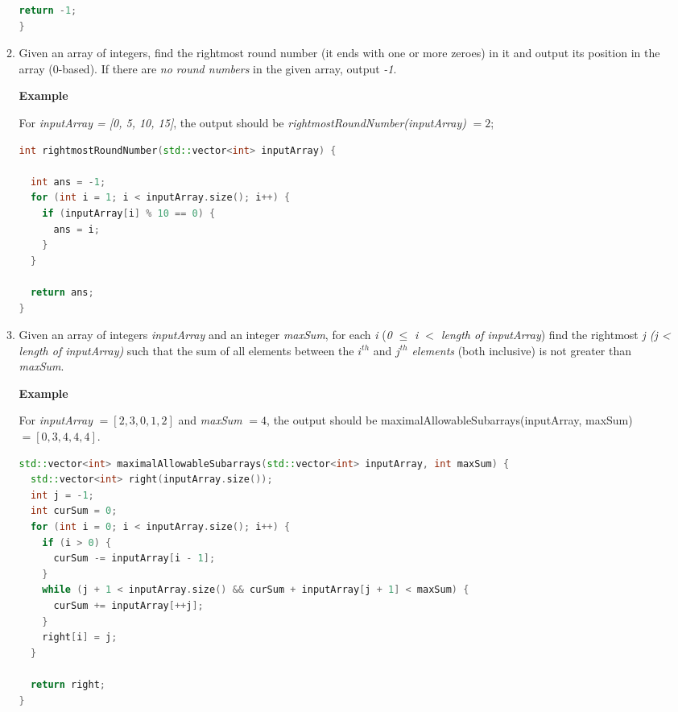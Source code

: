 \begin{enumerate}
\begin{enumerate}
\begin{lstlisting}[language=C++, frame=single]
  return -1;
}
	\end{lstlisting}


	\item Given an array of integers, find the rightmost round number (it ends with one or more zeroes) in it and output its position in the array (0-based). If there are \textit{no round numbers} in the given array, output \textit{-1}.

\textbf{Example}

    For \textit{inputArray = [0, 5, 10, 15]}, the output should be
    \textit{rightmostRoundNumber(inputArray)} $= 2$;
\begin{lstlisting}[language=C++, frame=single]
int rightmostRoundNumber(std::vector<int> inputArray) {

  int ans = -1;
  for (int i = 1; i < inputArray.size(); i++) {
    if (inputArray[i] % 10 == 0) {
      ans = i;
    }
  }

  return ans;
}

\end{lstlisting}



	\item Given an array of integers \textit{inputArray} and an integer \textit{maxSum}, for each \textit{i} (\textit{0} $\leq$ \textit{i $<$ length of inputArray}) find the rightmost \textit{j (j < length of inputArray)} such that the sum of all elements between the $i^{th}$ and $j^{th}$ \emph{elements} (both inclusive) is not greater than \textit{maxSum}.

\textbf{Example}

For \textit{inputArray} $= [2, 3, 0, 1, 2]$ and \textit{maxSum} $= 4$, the output should be
maximalAllowableSubarrays(inputArray, maxSum) $= [0, 3, 4, 4, 4]$.


\begin{lstlisting}[language=C++, frame=single]
std::vector<int> maximalAllowableSubarrays(std::vector<int> inputArray, int maxSum) {
  std::vector<int> right(inputArray.size());
  int j = -1;
  int curSum = 0;
  for (int i = 0; i < inputArray.size(); i++) {
    if (i > 0) {
      curSum -= inputArray[i - 1];
    }
    while (j + 1 < inputArray.size() && curSum + inputArray[j + 1] < maxSum) {
      curSum += inputArray[++j];
    }
    right[i] = j;
  }

  return right;
}
\end{lstlisting}
\end{enumerate}


\end{enumerate}
